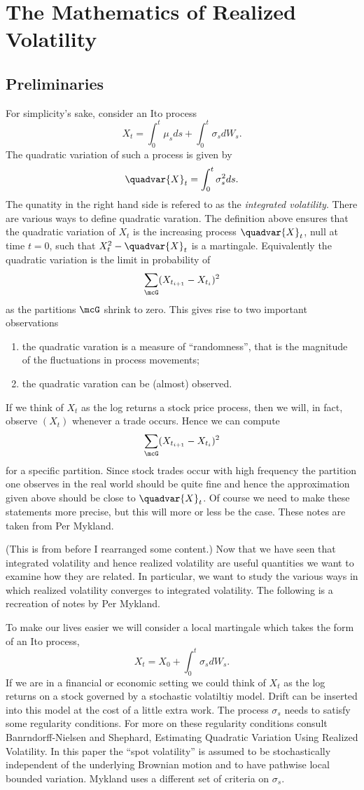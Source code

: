 \documentclass{report}
\begin{document}
\chapter{The Mathematics of Realized Volatility}

\section{Preliminaries}

For simplicity's sake, consider an Ito process
\[
X_t = \int_0^t \mu_s ds + \int_0^t \sigma_s dW_s.
\]
The quadratic variation of such a process is given by
\[
\quadvar{X}_t = \int_0^t \sigma_s^2 ds.
\]
The qunatity in the right hand side is refered to as the
\emph{integrated volatility}.  There are various ways to define
quadratic varation.  The definition above ensures that the quadratic
variation of $X_t$ is the increasing process $\quadvar{X}_t$, null at
time $t=0$, such that $X_t^2 - \quadvar{X}_t$ is a martingale. 
Equivalently the quadratic variation is the limit in probability of
\[
\sum_{\mcG} (X_{t_{i+1}} - X_{t_i})^2
\]
as the partitions $\mcG$ shrink to zero.  This gives rise to two
important observations
\begin{enumerate}
\item the quadratic varation is a measure of ``randomness'', that is
the magnitude of the fluctuations in process movements;
\item the quadratic varation can be (almost) observed.
\end{enumerate}
If we think of $X_t$ as the log returns a stock price process, then we
will, in fact, observe $(X_t)$ whenever a trade occurs.  Hence we can
compute
\[
\sum_{\mcG} (X_{t_{i+1}} - X_{t_i})^2
\]
for a specific partition.  Since stock trades occur with high
frequency the partition one observes in the real world should be quite
fine and hence the approximation given above should be close to
$\quadvar{X}_t$.  Of course we need to make these statements more
precise, but this will more or less be the case.  These notes are
taken from Per Mykland.

(This is from before I rearranged some content.)
Now that we have seen that integrated volatility and hence realized
volatility are useful quantities we want to examine how they are
related.  In particular, we want to study the various ways in which
realized volatility converges to integrated volatility.  The following
is a recreation of notes by Per Mykland.

To make our lives easier we will consider a local martingale which
takes the form of an Ito process,
\[
X_t = X_0 + \int_0^t \sigma_s dW_s.
\]
If we are in a financial or economic setting we could think of $X_t$
as the log returns on a stock governed by a stochastic volatiltiy
model.  Drift can be inserted into this model at the cost of a little
extra work.  The process $\sigma_s$ needs to satisfy some regularity
conditions.  For more on these regularity conditions consult
Banrndorff-Nielsen and Shephard, Estimating Quadratic Variation Using
Realized Volatility.  In this paper the ``spot volatility'' is assumed
to be stochastically independent of the underlying Brownian motion and
to have pathwise local bounded variation.  Mykland uses a different
set of criteria on $\sigma_s$.
\end{document}
